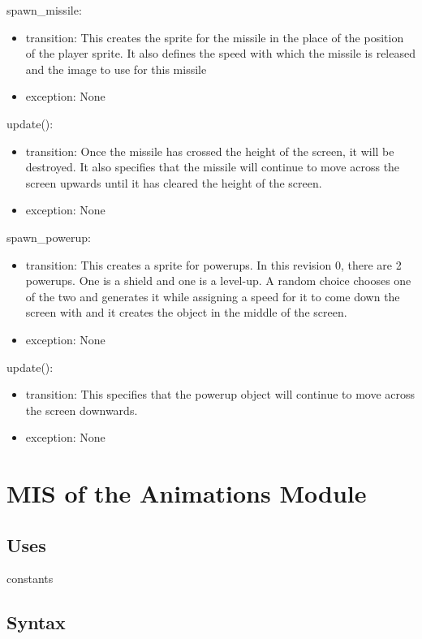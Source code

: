 \documentclass[12pt, titlepage]{article}
\begin{document}
\noindent spawn\_missile: 
\begin{itemize}
\item transition: This creates the sprite for the missile in the place of the position of the player sprite. It also defines the speed with which the missile is released and the image to use for this missile
\item exception: None
\end{itemize}

\noindent update():
\begin{itemize}
\item transition: Once the missile has crossed the height of the screen, it will be destroyed. It also specifies that the missile will continue to move across the screen upwards until it has cleared the height of the screen.
\item exception: None
\end{itemize}

\noindent spawn\_powerup: 
\begin{itemize}
\item transition: This creates a sprite for powerups. In this revision 0, there are 2 powerups. One is a shield and one is a level-up. A random choice chooses one of the two and generates it while assigning a speed for it to come down the screen with and it creates the object in the middle of the screen.
\item exception: None
\end{itemize}

\noindent update():
\begin{itemize}
\item transition: This specifies that the powerup object will continue to move across the screen downwards.
\item exception: None
\end{itemize}

\section{MIS of the Animations Module}

\subsection {Uses}

constants

\subsection {Syntax}
\end{document}
